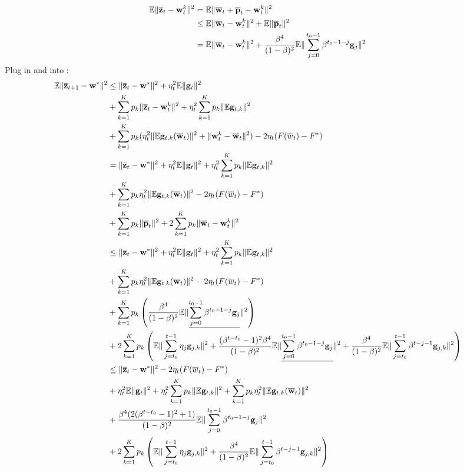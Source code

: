 \begin{align}
	\mathbb{E} \|\overline{{\mathbf{z}}}_t - {\mathbf{w}}_t^k\|^2 & =  \mathbb{E} \|\overline{{\mathbf{w}}}_t + \overline{{\mathbf{p}}}_{t}  - {\mathbf{w}}_t^k\|^2\\ 
 & \leq  \mathbb{E} \|\overline{{\mathbf{w}}}_t -{\mathbf{w}}_t^k \|^2 + \mathbb{E}\| \overline{{\mathbf{p}}}_{t}\|^2  \\
 &  =\mathbb{E} \|\overline{{\mathbf{w}}}_t -{\mathbf{w}}_t^k \|^2 + \frac{\beta^4}{(1-\beta)^2}\mathbb{E}\|\sum_{j=0}^{t_0 - 1}\beta^{t_0-1-j}{\mathbf{g}}_j\|^2 \label{eq:nagcvx6}
\end{align}
Plug in \eq{\ref{eq:nagcvx5}} and \eq{\ref{eq:nagcvx6}} into
\eq{\ref{eq:nagcvx4}}:
\begin{align}
	\mathbb{E}\|\overline{{\mathbf{z}}}_{t+1} - {\mathbf{w}}^* \|^2 & \leq \| \overline{{\mathbf{z}}}_{t} - {\mathbf{w}}^*\|^2  +  \eta_t^2\mathbb{E}\|{\mathbf{g}}_t\|^2  \nonumber\\
	&  + \sum_{k=1}^K p_k \|\overline{{\mathbf{z}}}_t - {\mathbf{w}}_t^k\|^2  +\eta^2_t \sum_{k=1}^K p_k\|\mathbb{E} {\mathbf{g}}_{t,k}\|^2 \nonumber \\
	& + \sum_{k=1}^K p_k (\eta_t^2 \|\mathbb{E} {\mathbf{g}}_{t,k}(\overline{{\mathbf{w}}}_t)\|^2 + \|{\mathbf{w}}_t^k - \overline{{\mathbf{w}}}_t\|^2) - 2\eta_t(F(\overline{w}_t) - F^*) \\
	& =  \| \overline{{\mathbf{z}}}_{t} - {\mathbf{w}}^*\|^2  +  \eta_t^2\mathbb{E}\|{\mathbf{g}}_t\|^2 +\eta^2_t \sum_{k=1}^K p_k\|\mathbb{E} {\mathbf{g}}_{t,k}\|^2  \nonumber\\
	& + \sum_{k=1}^K p_k \eta_t^2 \|\mathbb{E} {\mathbf{g}}_{t,k}(\overline{{\mathbf{w}}}_t)\|^2  - 2\eta_t(F(\overline{w}_t) - F^*) \nonumber \\
	&  + \sum_{k=1}^K p_k \|{\overline{\mathbf{p}}}_t\|^2 + 2\sum_{k=1}^K p_k \|{\overline{\mathbf{w}}}_t - {\mathbf{w}}_t^k\|^2  \\
	& \leq \| \overline{{\mathbf{z}}}_{t} - {\mathbf{w}}^*\|^2  +  \eta_t^2\mathbb{E}\|{\mathbf{g}}_t\|^2 +\eta^2_t \sum_{k=1}^K p_k\|\mathbb{E} {\mathbf{g}}_{t,k}\|^2  \nonumber\\
	& + \sum_{k=1}^K p_k \eta_t^2 \|\mathbb{E} {\mathbf{g}}_{t,k}(\overline{{\mathbf{w}}}_t)\|^2  - 2\eta_t(F(\overline{w}_t) - F^*) \nonumber \\
	& + \sum_{k=1}^K p_k \left(\frac{\beta^4}{(1-\beta)^2}\mathbb{E}\|\underline{\sum_{j=0}^{t_0 - 1}\beta^{t_0-1-j}{\mathbf{g}}_j}\|^2 \right) \nonumber\\
	& + 2\sum_{k=1}^K p_k \left(\mathbb{E} \|\sum_{j=t_0}^{t-1}\eta_j {\mathbf{g}}_{j,k}\|^2 + \frac{(\beta^{t-t_0}-1)^2\beta^4}{(1-\beta)^2}\mathbb{E}\|\underline{\sum_{j=0}^{t_0 - 1}\beta^{t_0-1-j}{\mathbf{g}}_j}\|^2 + \frac{\beta^4}{(1 - \beta)^2} \mathbb{E}\|\sum_{j=t_0}^{t-1}\beta^{t-j-1}{\mathbf{g}}_{j,k}\|^2 \right) \\
	& \leq \| \overline{{\mathbf{z}}}_{t} - {\mathbf{w}}^*\|^2  - 2\eta_t(F(\overline{w}_t) - F^*)  \nonumber\\
	& +  \eta_t^2\mathbb{E}\|{\mathbf{g}}_t\|^2 +\eta^2_t \sum_{k=1}^K p_k\|\mathbb{E} {\mathbf{g}}_{t,k}\|^2 + \sum_{k=1}^K p_k \eta_t^2 \|\mathbb{E} {\mathbf{g}}_{t,k}(\overline{{\mathbf{w}}}_t)\|^2  \nonumber \\
	& + \frac{\beta^4(2(\beta^{t-t_0}-1)^2 + 1)}{(1-\beta)^2} \mathbb{E}\|\sum_{j=0}^{t_0 - 1}\beta^{t_0-1-j}{\mathbf{g}}_j\|^2 \nonumber\\
	& + 2\sum_{k=1}^K p_k \left(\mathbb{E} \|\sum_{j=t_0}^{t-1}\eta_j {\mathbf{g}}_{j,k}\|^2  + \frac{\beta^4}{(1 - \beta)^2} \mathbb{E}\|\sum_{j=t_0}^{t-1}\beta^{t-j-1}{\mathbf{g}}_{j,k}\|^2 \right) \label{eq:nagcvx7}
\end{align}

